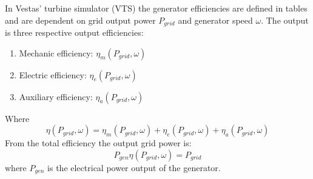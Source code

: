 In Vestas' turbine simulator (VTS) the generator efficiencies are defined in tables and are dependent on grid output power $ P_{grid} $ and generator speed $ \omega $. The output is three respective output efficiencies: 
\begin{enumerate}
	\item Mechanic efficiency: $ \eta_m(P_{grid},\omega) $
	\item Electric efficiency: $ \eta_e(P_{grid},\omega) $
	\item Auxiliary efficiency: $ \eta_a(P_{grid},\omega) $
\end{enumerate}
Where 
\begin{equation}\label{eq:wtLin_gen_effi}
	\eta(P_{grid},\omega) = \eta_m(P_{grid},\omega) + \eta_e(P_{grid},\omega) + \eta_a(P_{grid},\omega)
\end{equation}
From the total efficiency the output grid power is:
\begin{equation}\label{eq:wtLin_gen_elec_pow}
	P_{gen} \eta(P_{grid},\omega) = P_{grid}
\end{equation}
where $ P_{gen} $ is the electrical power output of the generator.

